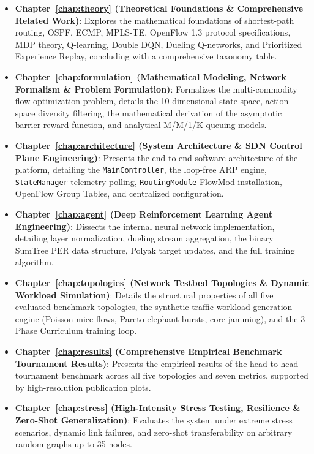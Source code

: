 \begin{itemize}
    \item \textbf{Chapter~\ref{chap:theory} (Theoretical Foundations \& Comprehensive Related Work)}: Explores the mathematical foundations of shortest-path routing, OSPF, ECMP, MPLS-TE, OpenFlow 1.3 protocol specifications, MDP theory, Q-learning, Double DQN, Dueling Q-networks, and Prioritized Experience Replay, concluding with a comprehensive taxonomy table.
    \item \textbf{Chapter~\ref{chap:formulation} (Mathematical Modeling, Network Formalism \& Problem Formulation)}: Formalizes the multi-commodity flow optimization problem, details the 10-dimensional state space, action space diversity filtering, the mathematical derivation of the asymptotic barrier reward function, and analytical M/M/1/K queuing models.
    \item \textbf{Chapter~\ref{chap:architecture} (System Architecture \& SDN Control Plane Engineering)}: Presents the end-to-end software architecture of the platform, detailing the \texttt{MainController}, the loop-free ARP engine, \texttt{StateManager} telemetry polling, \texttt{RoutingModule} FlowMod installation, OpenFlow Group Tables, and centralized configuration.
    \item \textbf{Chapter~\ref{chap:agent} (Deep Reinforcement Learning Agent Engineering)}: Dissects the internal neural network implementation, detailing layer normalization, dueling stream aggregation, the binary SumTree PER data structure, Polyak target updates, and the full training algorithm.
    \item \textbf{Chapter~\ref{chap:topologies} (Network Testbed Topologies \& Dynamic Workload Simulation)}: Details the structural properties of all five evaluated benchmark topologies, the synthetic traffic workload generation engine (Poisson mice flows, Pareto elephant bursts, core jamming), and the 3-Phase Curriculum training loop.
    \item \textbf{Chapter~\ref{chap:results} (Comprehensive Empirical Benchmark Tournament Results)}: Presents the empirical results of the head-to-head tournament benchmark across all five topologies and seven metrics, supported by high-resolution publication plots.
    \item \textbf{Chapter~\ref{chap:stress} (High-Intensity Stress Testing, Resilience \& Zero-Shot Generalization)}: Evaluates the system under extreme stress scenarios, dynamic link failures, and zero-shot transferability on arbitrary random graphs up to 35 nodes.

\end{itemize}
